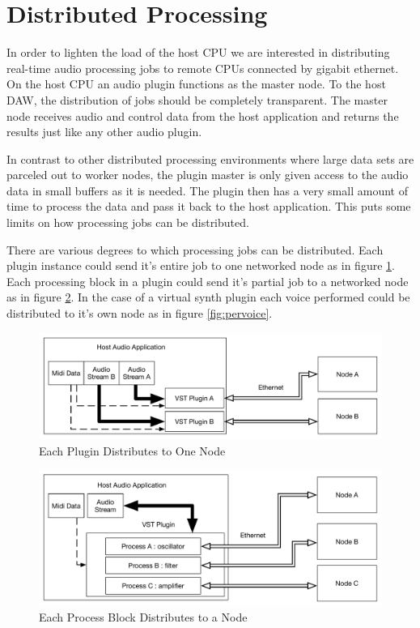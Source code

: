 \section{Distributed Processing}

In order to lighten the load of the host CPU we are interested in distributing real-time audio processing jobs to remote CPUs connected by gigabit ethernet. On the host CPU an audio plugin functions as the master node. To the host DAW, the distribution of jobs should be completely transparent. The master node receives audio and control data from the host application and returns the results just like any other audio plugin.

In contrast to other distributed processing environments where large data sets are parceled out to worker nodes, the plugin master is only given access to the audio data in small buffers as it is needed. The plugin then has a very small amount of time to process the data and pass it back to the host application. This puts some limits on how processing jobs can be distributed.

There are various degrees to which processing jobs can be distributed. Each plugin instance could send it's entire job to one networked node as in figure \ref{fig:one_to_one}. Each processing block in a plugin could send it's partial job to a networked node as in figure \ref{fig:perproccessor}. In the case of a virtual synth plugin each voice performed could be distributed to it's own node as in figure \ref{fig:pervoice}.

\begin{figure}[H]
    \centering
    \includegraphics[width=\textwidth]{assets/distribution_1to1.pdf}
    \caption{Each Plugin Distributes to One Node}
    \label{fig:one_to_one}
\end{figure}

\begin{figure}[H]
    \centering
    \includegraphics[width=\textwidth]{assets/distribution_perprocessor.pdf}
    \caption{Each Process Block Distributes to a Node}
    \label{fig:perproccessor}
\end{figure}

